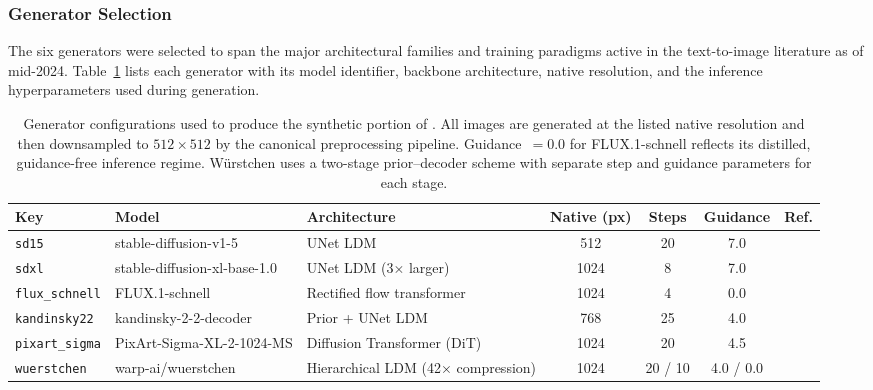 \subsubsection{Generator Selection}

The six generators were selected to span the major architectural
families and training paradigms active in the text-to-image literature
as of mid-2024.
Table~\ref{tab:generators} lists each generator with its model
identifier, backbone architecture, native resolution, and the inference
hyperparameters used during generation.

\begin{table}[t]
\centering
\caption{Generator configurations used to produce the synthetic
portion of \textbf{\datasetname}.
All images are generated at the listed native resolution and then
downsampled to $512 \times 512$ by the canonical preprocessing
pipeline. Guidance~$= 0.0$ for FLUX.1-schnell reflects its
distilled, guidance-free inference regime. W\"{u}rstchen uses a
two-stage prior--decoder scheme with separate step and guidance
parameters for each stage.}
\label{tab:generators}
\small
\setlength{\tabcolsep}{5pt}
\begin{tabular}{@{}l>{\raggedright\arraybackslash}p{3.5cm}>{\raggedright\arraybackslash}p{3.6cm}cccl@{}}
\toprule
Key & Model & Architecture & Native (px) & Steps & Guidance & Ref. \\
\midrule
\texttt{sd15}
  & stable-diffusion-v1-5
  & UNet LDM
  & 512
  & 20
  & 7.0
  & \cite{rombach2022ldm} \\
\texttt{sdxl}
  & stable-diffusion-xl-base-1.0
  & UNet LDM (3$\times$ larger)
  & 1024
  & 8
  & 7.0
  & \cite{podell2024sdxl} \\
\texttt{flux\_schnell}
  & FLUX.1-schnell
  & Rectified flow transformer
  & 1024
  & 4
  & 0.0
  & \cite{flux2024bfl} \\
\texttt{kandinsky22}
  & kandinsky-2-2-decoder
  & Prior + UNet LDM
  & 768
  & 25
  & 4.0
  & \cite{razzhigaev2023kandinsky} \\
\texttt{pixart\_sigma}
  & PixArt-Sigma-XL-2-1024-MS
  & Diffusion Transformer (DiT)
  & 1024
  & 20
  & 4.5
  & \cite{chen2024pixart} \\
\texttt{wuerstchen}
  & warp-ai/wuerstchen
  & Hierarchical LDM (42$\times$ compression)
  & 1024
  & 20 / 10
  & 4.0 / 0.0
  & \cite{pernias2023wuerstchen} \\
\bottomrule
\end{tabular}
\end{table}

